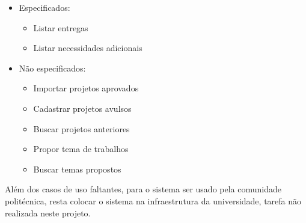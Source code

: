 \begin{itemize}
    \item Especificados:
    \begin{itemize}
        \item Listar entregas
        \item Listar necessidades adicionais
    \end{itemize}
    
    \item Não especificados:
    \begin{itemize}
        \item Importar projetos aprovados
        \item Cadastrar projetos avulsos
        \item Buscar projetos anteriores
        \item Propor tema de trabalhos
        \item Buscar temas propostos
    \end{itemize}
\end{itemize}

Além dos casos de uso faltantes, para o sistema ser usado pela comunidade politécnica, resta colocar o sistema na infraestrutura da universidade, tarefa não realizada neste projeto.